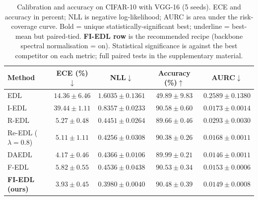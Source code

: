 \documentclass[review,5p,times]{elsarticle}
\begin{document}
\begin{table}[t]
  \centering
  \caption{Calibration and accuracy on CIFAR-10 with VGG-16 (5 seeds).
    ECE and accuracy in percent; NLL is negative log-likelihood; AURC is
    area under the risk-coverage curve. Bold = unique
    statistically-significant best; underline = best-mean but
    paired-tied. \textbf{FI-EDL row} is the recommended recipe
    (backbone spectral normalisation = on). Statistical significance is
    against the best competitor on each metric; full paired tests in the
    supplementary material.}
  \label{tab:main-cifar10}
  \small
  \begin{tabular}{lcccc}
    \toprule
    Method & ECE (\%)$\downarrow$ & NLL$\downarrow$ & Accuracy (\%)$\uparrow$ & AURC$\downarrow$ \\
    \midrule
    EDL    & $14.36 \pm 6.46$ & $1.6035 \pm 0.1361$ & $49.89 \pm 9.83$ & $0.2589 \pm 0.1380$ \\
    I-EDL  & $39.44 \pm 1.11$ & $0.8357 \pm 0.0233$ & $90.58 \pm 0.60$ & $0.0173 \pm 0.0014$ \\
    R-EDL  & $5.27 \pm 0.48$  & $0.4451 \pm 0.0264$ & $89.66 \pm 0.46$ & $0.0293 \pm 0.0030$ \\
    Re-EDL ($\lambda{=}0.8$) & $5.11 \pm 1.11$ & $0.4256 \pm 0.0308$ & $90.38 \pm 0.26$ & $0.0168 \pm 0.0011$ \\
    DAEDL  & $4.17 \pm 0.46$  & $0.4366 \pm 0.0106$ & $89.99 \pm 0.21$ & $0.0146 \pm 0.0011$ \\
    F-EDL  & $5.82 \pm 0.55$  & $0.4536 \pm 0.0438$ & $90.53 \pm 0.34$ & $0.0153 \pm 0.0006$ \\
    \textbf{FI-EDL (ours)} & \underline{$3.93 \pm 0.45$} & $0.3980 \pm 0.0040$ & $90.48 \pm 0.39$ & $0.0149 \pm 0.0008$ \\
    \bottomrule
  \end{tabular}
\end{table}
\end{document}
